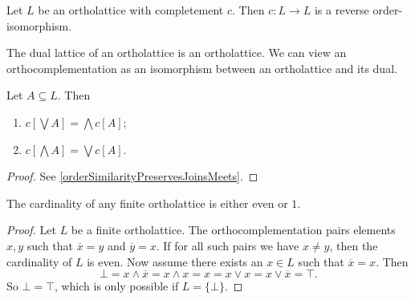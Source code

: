 \begin{lemma}
Let $L$ be an ortholattice with completement $c$. Then $c: L \to L$ is a reverse order-isomorphism.
\end{lemma}
\begin{corollary}
The dual lattice of an ortholattice is an ortholattice. We can view an orthocomplementation as an isomorphism between an ortholattice and its dual.
\end{corollary}
\begin{corollary}
Let $A\subseteq L$. Then
\begin{enumerate}
\item $c\left[\bigvee A\right] = \bigwedge c[A]$;
\item $c\left[\bigwedge A\right] = \bigvee c[A]$.
\end{enumerate}
\end{corollary}
\begin{proof}
See \ref{orderSimilarityPreservesJoinsMeets}.
\end{proof}

\begin{proposition}
The cardinality of any finite ortholattice is either even or $1$.
\end{proposition}
\begin{proof}
Let $L$ be a finite ortholattice.
The orthocomplementation pairs elements $x,y$ such that $\overline{x} = y$ and $\overline{y} = x$. If for all such pairs we have $x\neq y$, then the cardinality of $L$ is even. Now assume there exists an $x\in L$ such that $\overline{x} = x$. Then 
\[ \bot = x\wedge \overline{x} = x\wedge x = x = x\vee x = x\vee \overline{x} = \top. \]
So $\bot = \top$, which is only possible if $L = \{\bot\}$.
\end{proof}


